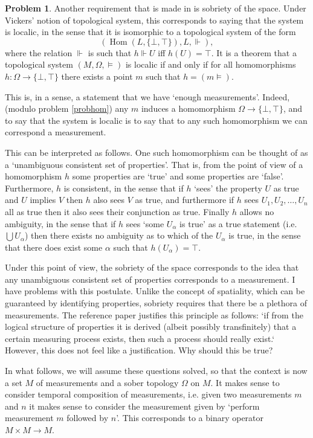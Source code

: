 \documentclass{article}
\theoremstyle{definition}
\newtheorem{problem}{Problem}
\DeclareMathOperator{\Hom}{Hom}
\begin{document}
\begin{problem}
Another requirement that is made in \cite{measurement} is sobriety of the space. Under Vickers' notion of topological system, this corresponds to saying that the system is localic, in the sense that it is isomorphic to a topological system of the form
\[(\Hom(L, \{\bot, \top\}), L, \Vdash),\]
where the relation $\Vdash$ is such that $h \Vdash U$ iff $h(U) = \top$. It is a theorem that a topological system $(M, \Omega, \vDash)$ is localic if and only if for all homomorphisms $h : \Omega \to \{\bot, \top\}$ there exists a point $m$ such that $h = (m \vDash)$.

This is, in a sense, a statement that we have `enough measurements'. Indeed, (modulo problem \ref{probhom}) any $m$ induces a homomorphism $\Omega \to \{\bot,\top\}$, and to say that the system is localic is to say that to any such homomorphism we can correspond a measurement.

This can be interpreted as follows. One such homomorphism can be thought of as a `unambiguous consistent set of properties'. That is, from the point of view of a homomorphism $h$ some properties are `true' and some properties are `false'. Furthermore, $h$ is consistent, in the sense that if $h$ `sees' the property $U$ as true and $U$ implies $V$ then $h$ also sees $V$ as true, and furthermore if $h$ sees $U_1, U_2, \dots, U_n$ all as true then it also sees their conjunction as true. Finally $h$ allows no ambiguity, in the sense that if $h$ sees `some $U_\alpha$ is true' as a true statement (i.e. $\bigcup U_\alpha$) then there exists no ambiguity as to which of the $U_\alpha$ is true, in the sense that there does exist some $\alpha$ such that $h(U_\alpha) = \top$.

Under this point of view, the sobriety of the space corresponds to the idea that any unambiguous consistent set of properties corresponds to a measurement. I have problems with this postulate. Unlike the concept of spatiality, which can be guaranteed by identifying properties, sobriety requires that there be a plethora of measurements. The reference paper \cite{measurement} justifies this principle as follows: `if from the logical structure of properties it is derived (albeit possibly transfinitely) that a certain measuring process exists, then such a process should really exist.` However, this does not feel like a justification. Why should this be true?
\end{problem}

In what follows, we will assume these questions solved, so that the context is now a set $M$ of measurements and a sober topology $\Omega$ on $M$. It makes sense to consider temporal composition of measurements, i.e. given two measurements $m$ and $n$ it makes sense to consider the measurement given by `perform measurement $m$ followed by $n$'. This corresponds to a binary operator $M \times M \to M$.
\end{document}
